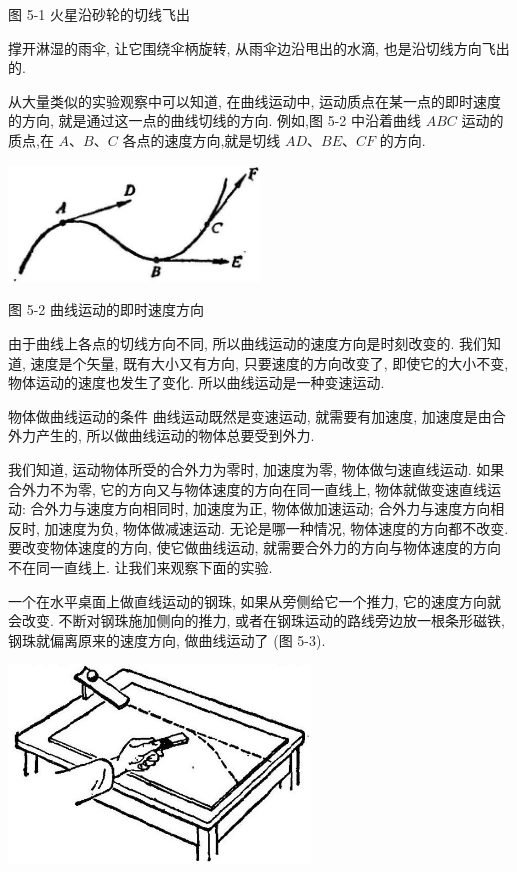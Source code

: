 \documentclass[10pt]{article}
\begin{document}
图 5-1 火星沿砂轮的切线飞出

撑开淋湿的雨伞, 让它围绕伞柄旋转, 从雨伞边沿甩出的水滴, 也是沿切线方向飞出的.

从大量类似的实验观察中可以知道, 在曲线运动中, 运动质点在某一点的即时速度的方向, 就是通过这一点的曲线切线的方向. 例如,图 5-2 中沿着曲线 \({ABC}\) 运动的质点,在 \(A\text{、}B\text{、}C\) 各点的速度方向,就是切线 \({AD}\text{、}{BE}\text{、}{CF}\) 的方向.

\begin{center}
\includegraphics[max width=0.5\textwidth]{images/01912d55-147c-70aa-b0e0-1782a122f948_131_907369.jpg}
\end{center}

图 5-2 曲线运动的即时速度方向

由于曲线上各点的切线方向不同, 所以曲线运动的速度方向是时刻改变的. 我们知道, 速度是个矢量, 既有大小又有方向, 只要速度的方向改变了, 即使它的大小不变, 物体运动的速度也发生了变化. 所以曲线运动是一种变速运动.

物体做曲线运动的条件 曲线运动既然是变速运动, 就需要有加速度, 加速度是由合外力产生的, 所以做曲线运动的物体总要受到外力.

我们知道, 运动物体所受的合外力为零时, 加速度为零, 物体做匀速直线运动. 如果合外力不为零, 它的方向又与物体速度的方向在同一直线上, 物体就做变速直线运动: 合外力与速度方向相同时, 加速度为正, 物体做加速运动; 合外力与速度方向相反时, 加速度为负, 物体做减速运动. 无论是哪一种情况, 物体速度的方向都不改变. 要改变物体速度的方向, 使它做曲线运动, 就需要合外力的方向与物体速度的方向不在同一直线上. 让我们来观察下面的实验.

一个在水平桌面上做直线运动的钢珠, 如果从旁侧给它一个推力, 它的速度方向就会改变. 不断对钢珠施加侧向的推力, 或者在钢珠运动的路线旁边放一根条形磁铁, 钢珠就偏离原来的速度方向, 做曲线运动了 (图 5-3).

\begin{center}
\includegraphics[max width=0.6\textwidth]{images/01912d55-147c-70aa-b0e0-1782a122f948_132_809844.jpg}
\end{center}
\end{document}
